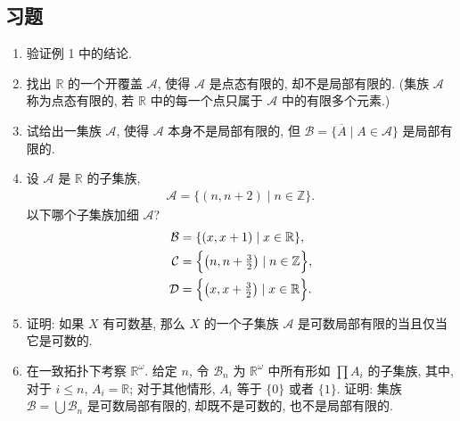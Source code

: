 \documentclass[../../main.tex]{subfiles}
\begin{document}
\subsection*{习题}

\begin{enumerate}
\item 验证例 1 中的结论.
\item 找出 $\mathbb{R}$ 的一个开覆盖 $\mathcal{A}$, 使得 $\mathcal{A}$ 是点态有限的, 却不是局部有限的. (集族 $\mathcal{A}$ 称为点态有限的, 若 $\mathbb{R}$ 中的每一个点只属于 $\mathcal{A}$ 中的有限多个元素.)
\item 试给出一集族 $\mathcal{A}$, 使得 $\mathcal{A}$ 本身不是局部有限的, 但 $\mathcal{B}=\{\overline{A}\mid A\in\mathcal{A}\}$ 是局部有限的.
\item 设 $\mathcal{A}$ 是 $\mathbb{R}$ 的子集族,
\begin{align*}
\mathcal{A}=\{(n,n+2)\mid n\in\mathbb{Z}\}.
\end{align*}
以下哪个子集族加细 $\mathcal{A}$?
\begin{align*}
\mathcal{B}&=\{(x,x+1)\mid x\in\mathbb{R}\},\\
\mathcal{C}&=\Bigl\{\bigl(n,n+\tfrac32\bigr)\mid n\in\mathbb{Z}\Bigr\},\\
\mathcal{D}&=\Bigl\{\bigl(x,x+\tfrac32\bigr)\mid x\in\mathbb{R}\Bigr\}.
\end{align*}
\item 证明: 如果 $X$ 有可数基, 那么 $X$ 的一个子集族 $\mathcal{A}$ 是可数局部有限的当且仅当它是可数的.
\item 在一致拓扑下考察 $\mathbb{R}^\omega$. 给定 $n$, 令 $\mathcal{B}_n$ 为 $\mathbb{R}^\omega$ 中所有形如 $\prod A_i$ 的子集族, 其中, 对于 $i\leqslant n$, $A_i=\mathbb{R}$; 对于其他情形, $A_i$ 等于 $\{0\}$ 或者 $\{1\}$. 证明: 集族 $\mathcal{B}=\bigcup\mathcal{B}_n$ 是可数局部有限的, 却既不是可数的, 也不是局部有限的.
\end{enumerate}
\end{document}
